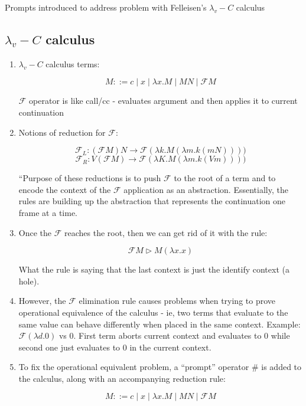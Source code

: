 \documentclass[letterpaper]{llncs}
\newcommand{\F}{ \ensuremath{ \mathcal{F} } }
\newcommand{\lamdavC}{ \ensuremath{ \lambda_v\!\!-\!\!C } }
\begin{document}
Prompts introduced to address problem with Felleisen's $\lambda_v\!\!-\!\!C$ calculus~\cite{Felleisen1987SyntacticTheory}
	
\subsection*{$\lamdavC$ calculus}

\begin{enumerate}

	\item $\lambda_v\!\!-\!\!C$ calculus terms:
	
$$M ::= c \mid x \mid \lambda x.M \mid M N \mid \F M$$

$\F$ operator is like call/cc - evaluates argument and then applies it to current continuation
	
	\item Notions of reduction for $\F$:
	
	$$\F_L: (\F M) N \rightarrow \F (\lambda k.M (\lambda m.k (m N))))$$
	$$\F_R: V (\F M) \rightarrow \F (\lambda K.M (\lambda m.k (V m))))$$

``Purpose of these reductions is to push $\F$ to the root of a term and to encode the context of the $\F$ application as an abstraction. Essentially, the rules are building up the abstraction that represents the continuation one frame at a time.

	\item

Once the $\F$ reaches the root, then we can get rid of it with the rule:

$$\F M \triangleright M (\lambda x.x)$$

What the rule is saying that the last context is just the identify context (a hole).

	\item However, the $\F$ elimination rule causes problems when trying to prove operational equivalence of the calculus - ie, two terms that evaluate to the same value can behave differently when placed in the same context. Example: $\F (\lambda d.0)$ vs 0. First term aborts current context and evaluates to 0 while second one just evaluates to 0 in the current context.
	
	\item To fix the operational equivalent problem, a ``prompt'' operator \# is added to the calculus, along with an accompanying reduction rule:
	
	$$M ::= c \mid x \mid \lambda x.M \mid M N \mid \F M$$


\end{enumerate}
\end{document}
